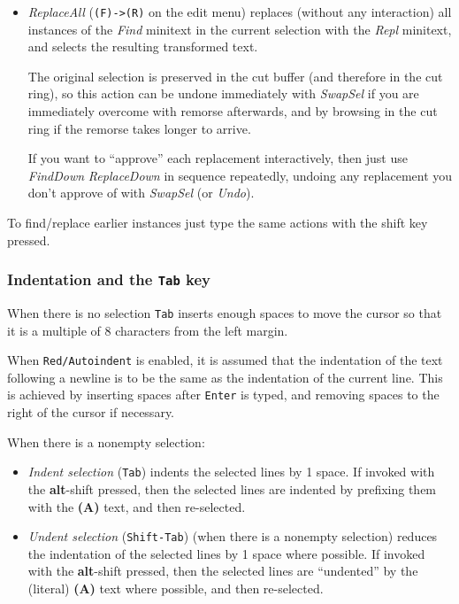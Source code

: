 \documentclass[11pt,a4paper]{article}
\begin{document}
\begin{itemize}
\item
  \emph{ReplaceAll} (\texttt{(F)-\textgreater{}(R)} on the edit menu)
  replaces (without any interaction) all instances of the \emph{Find}
  minitext in the current selection with the \emph{Repl} minitext, and
  selects the resulting transformed text.

  The original selection is preserved in the cut buffer (and therefore
  in the cut ring), so this action can be undone immediately with
  \emph{SwapSel} if you are immediately overcome with remorse
  afterwards, and by browsing in the cut ring if the remorse takes
  longer to arrive.

  If you want to ``approve'' each replacement interactively, then just
  use \emph{FindDown} \emph{ReplaceDown} in sequence repeatedly, undoing
  any replacement you don't approve of with \emph{SwapSel} (or
  \emph{Undo}).
\end{itemize}

To find/replace earlier instances just type the same actions with the
shift key pressed.






\hypertarget{indentation}{%
\subsubsection{Indentation and the \texttt{Tab} key}\label{indentation}}

When there is no selection \texttt{Tab} inserts enough spaces to
move the cursor so that it is a multiple of 8 characters from the left
margin.

When \texttt{Red/Autoindent} is enabled, it is assumed that the
indentation of the text following a newline is to be the same as the
indentation of the current line. This is achieved by inserting spaces
after \texttt{Enter} is typed, and removing spaces to the right of the
cursor if necessary.

When there is a nonempty selection:

\begin{itemize}
\item
  \emph{Indent selection} (\texttt{Tab}) indents the selected lines by 1
  space. If invoked with the \textbf{alt}-shift pressed, then the
  selected lines are indented by prefixing them with the \textbf{(A)}
  text, and then re-selected.
\item
  \emph{Undent selection} (\texttt{Shift-Tab}) (when there is a nonempty
  selection) reduces the indentation of the selected lines by 1 space
  where possible. If invoked with the \textbf{alt}-shift pressed, then
  the selected lines are ``undented'' by the (literal) \textbf{(A)} text
  where possible, and then re-selected.
\end{itemize}
\end{document}
